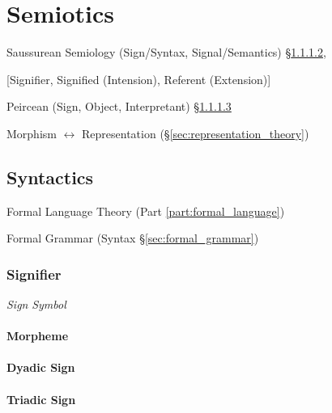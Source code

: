 \section{Semiotics}\label{sec:semiotics}

Saussurean Semiology (Sign/Syntax, Signal/Semantics)
\S\ref{sec:dyadic_sign},

[Signifier, Signified (Intension), Referent (Extension)]

Peircean (Sign, Object, Interpretant) \S\ref{sec:triadic_sign}

Morphism $\leftrightarrow$ Representation
(\S\ref{sec:representation_theory})



\subsection{Syntactics}\label{sec:syntactics}

Formal Language Theory (Part \ref{part:formal_language})

Formal Grammar (Syntax \S\ref{sec:formal_grammar})



\subsubsection{Signifier}\label{sec:signifier}

\emph{Sign} \emph{Symbol}



\paragraph{Morpheme}\label{sec:morpheme}\hfill

\paragraph{Dyadic Sign}\label{sec:dyadic_sign}\hfill

\paragraph{Triadic Sign}\label{sec:triadic_sign}\hfill



